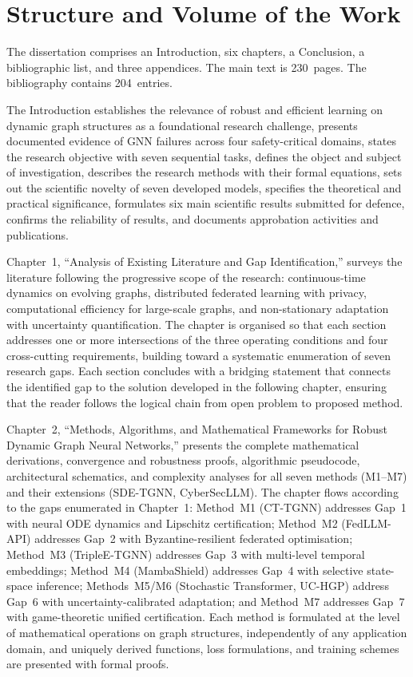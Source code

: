 \section*{Structure and Volume of the Work}

The dissertation comprises an Introduction, six chapters, a Conclusion, a bibliographic list, and three appendices. The main text is 230~pages. The bibliography contains 204~entries.

The Introduction establishes the relevance of robust and efficient learning on dynamic graph structures as a foundational research challenge, presents documented evidence of GNN failures across four safety-critical domains, states the research objective with seven sequential tasks, defines the object and subject of investigation, describes the research methods with their formal equations, sets out the scientific novelty of seven developed models, specifies the theoretical and practical significance, formulates six main scientific results submitted for defence, confirms the reliability of results, and documents approbation activities and publications.

Chapter~1, ``Analysis of Existing Literature and Gap Identification,'' surveys the literature following the progressive scope of the research: continuous-time dynamics on evolving graphs, distributed federated learning with privacy, computational efficiency for large-scale graphs, and non-stationary adaptation with uncertainty quantification. The chapter is organised so that each section addresses one or more intersections of the three operating conditions and four cross-cutting requirements, building toward a systematic enumeration of seven research gaps. Each section concludes with a bridging statement that connects the identified gap to the solution developed in the following chapter, ensuring that the reader follows the logical chain from open problem to proposed method.

Chapter~2, ``Methods, Algorithms, and Mathematical Frameworks for Robust Dynamic Graph Neural Networks,'' presents the complete mathematical derivations, convergence and robustness proofs, algorithmic pseudocode, architectural schematics, and complexity analyses for all seven methods (M1--M7) and their extensions (SDE-TGNN, CyberSecLLM). The chapter flows according to the gaps enumerated in Chapter~1: Method~M1 (CT-TGNN) addresses Gap~1 with neural ODE dynamics and Lipschitz certification; Method~M2 (FedLLM-API) addresses Gap~2 with Byzantine-resilient federated optimisation; Method~M3 (TripleE-TGNN) addresses Gap~3 with multi-level temporal embeddings; Method~M4 (MambaShield) addresses Gap~4 with selective state-space inference; Methods~M5/M6 (Stochastic Transformer, UC-HGP) address Gap~6 with uncertainty-calibrated adaptation; and Method~M7 addresses Gap~7 with game-theoretic unified certification. Each method is formulated at the level of mathematical operations on graph structures, independently of any application domain, and uniquely derived functions, loss formulations, and training schemes are presented with formal proofs.

